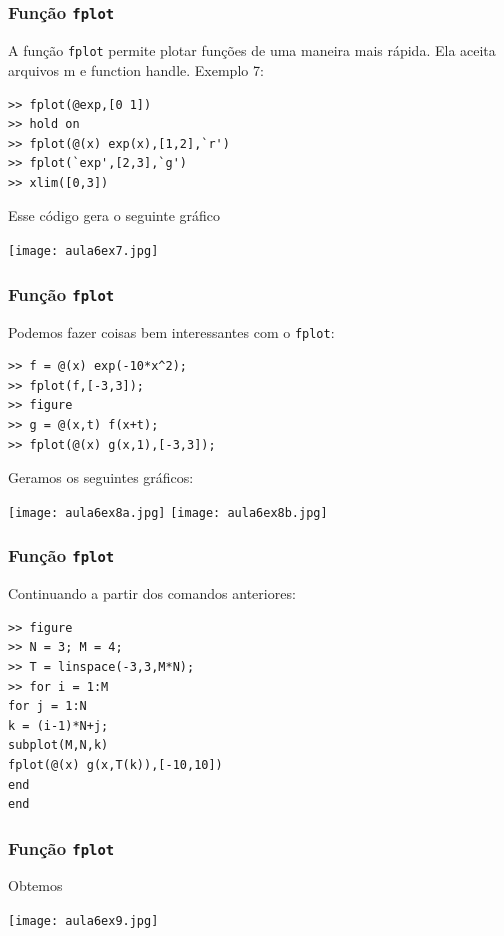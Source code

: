 \documentclass{beamer}
\newcommand{\ssiz}{\scriptsize}
\begin{document}
\subsection[Fun\c{c}\~ao fplot]{}

\begin{frame}[fragile]
\frametitle{Fun\c{c}\~ao {\tt fplot}}

A fun\c{c}\~ao {\tt fplot} permite plotar fun\c{c}\~oes de uma maneira mais
r\'apida. Ela aceita arquivos m e function handle.
\pause
Exemplo 7:
{\ssiz
\begin{verbatim}
>> fplot(@exp,[0 1])
>> hold on
>> fplot(@(x) exp(x),[1,2],`r')
>> fplot(`exp',[2,3],`g')
>> xlim([0,3])
\end{verbatim}
}
\pause
Esse c\'odigo gera o seguinte gr\'afico
\begin{center}
\texttt{[image: aula6ex7.jpg]}
\end{center}

\end{frame}

\begin{frame}[fragile]
\frametitle{Fun\c{c}\~ao {\tt fplot}}

Podemos fazer coisas bem interessantes com o {\tt fplot}:
\pause

{\ssiz
\begin{verbatim}
>> f = @(x) exp(-10*x^2);
>> fplot(f,[-3,3]);
>> figure
>> g = @(x,t) f(x+t);
>> fplot(@(x) g(x,1),[-3,3]);
\end{verbatim}
Geramos os seguintes gr\'aficos:

\begin{center}
\texttt{[image: aula6ex8a.jpg]}
\texttt{[image: aula6ex8b.jpg]}
\end{center}

}

\end{frame}

\begin{frame}[fragile]
\frametitle{Fun\c{c}\~ao {\tt fplot}}

Continuando a partir dos comandos anteriores:

\begin{verbatim}
>> figure
>> N = 3; M = 4;
>> T = linspace(-3,3,M*N);
>> for i = 1:M
for j = 1:N
k = (i-1)*N+j;
subplot(M,N,k)
fplot(@(x) g(x,T(k)),[-10,10])
end
end
\end{verbatim}

\end{frame}

\begin{frame}
\frametitle{Fun\c{c}\~ao {\tt fplot}}

\begin{center}
Obtemos

\texttt{[image: aula6ex9.jpg]}
\end{center}

\end{frame}
\end{document}
